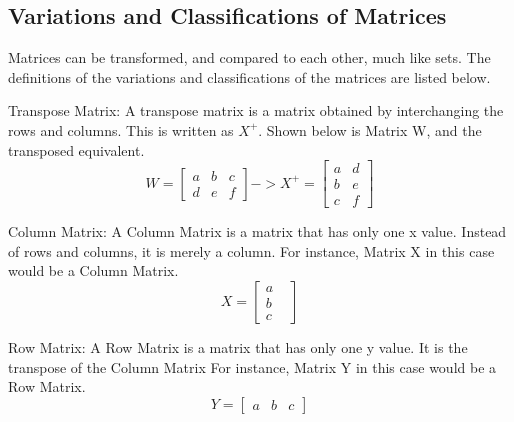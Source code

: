     \subsection{Variations and Classifications of Matrices}
    Matrices can be transformed, and compared to each other, much like sets.
    The definitions of the variations and classifications of the matrices are listed below.
    \begin{definition}Transpose Matrix: 
        A transpose matrix is a matrix obtained by interchanging the rows and columns. This is written as $X^{+}$. Shown below is Matrix W, and the transposed equivalent.
        \begin{equation*}
            W =
            \begin{bmatrix}
                a & b & c \\
                d & e & f
            \end{bmatrix}
            -> X^{+} =
            \begin{bmatrix}
                a & d \\
                b & e \\
                c & f
            \end{bmatrix}
        \end{equation*}
    \end{definition}
        
    \begin{definition}Column Matrix:
        A Column Matrix is a matrix that has only one x value. Instead of rows and columns, it is merely a column.
        For instance, Matrix X in this case would be a Column Matrix.
        \begin{equation*}%
            X =
            \begin{bmatrix}
                a&\\
                b&\\
                c
            \end{bmatrix}
        \end{equation*}
    \end{definition}
        
    \begin{definition}Row Matrix:
        A Row Matrix is a matrix that has only one y value. It is the transpose of the Column Matrix For instance, Matrix Y in this case would be a Row Matrix.
        \begin{equation*}%
            Y =
            \begin{bmatrix}
                a & b & c
            \end{bmatrix}
        \end{equation*}
    \end{definition}
        
